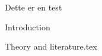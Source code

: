 \documentclass[12pt]{article}
\begin{document}
Dette er en test 

{Introduction}


{Theory and literature.tex}
\end{document}
